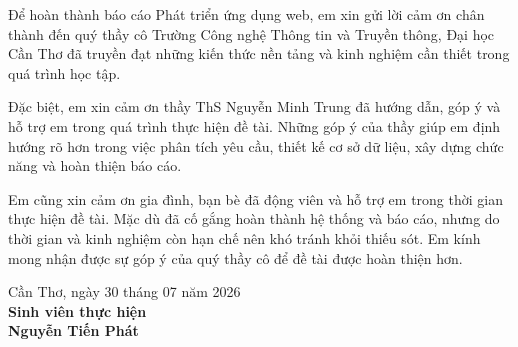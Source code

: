 \documentclass[../main.tex]{subfiles}
\begin{document}
Để hoàn thành báo cáo Phát triển ứng dụng web, em xin gửi lời cảm ơn chân thành đến quý thầy cô Trường Công nghệ Thông tin và Truyền thông, Đại học Cần Thơ đã truyền đạt những kiến thức nền tảng và kinh nghiệm cần thiết trong quá trình học tập.

Đặc biệt, em xin cảm ơn thầy ThS Nguyễn Minh Trung đã hướng dẫn, góp ý và hỗ trợ em trong quá trình thực hiện đề tài. Những góp ý của thầy giúp em định hướng rõ hơn trong việc phân tích yêu cầu, thiết kế cơ sở dữ liệu, xây dựng chức năng và hoàn thiện báo cáo.

Em cũng xin cảm ơn gia đình, bạn bè đã động viên và hỗ trợ em trong thời gian thực hiện đề tài. Mặc dù đã cố gắng hoàn thành hệ thống và báo cáo, nhưng do thời gian và kinh nghiệm còn hạn chế nên khó tránh khỏi thiếu sót. Em kính mong nhận được sự góp ý của quý thầy cô để đề tài được hoàn thiện hơn.

\begin{flushright}
\begin{minipage}{0.5\textwidth}
\centering
    Cần Thơ, ngày 30 tháng 07 năm 2026\\[0.45cm]
    \textbf{Sinh viên thực hiện}\\[0.9cm]
    \textbf{Nguyễn Tiến Phát}
\end{minipage}
\end{flushright}
\end{document}
